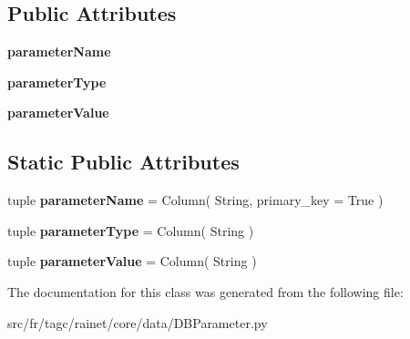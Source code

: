 \subsection*{Public Attributes}
\begin{DoxyCompactItemize}
\item 
\hypertarget{classsrc_1_1fr_1_1tagc_1_1rainet_1_1core_1_1data_1_1DBParameter_1_1DBParameter_ae61b54e9c86bb19e10582ed189111596}{{\bfseries parameter\-Name}}\label{classsrc_1_1fr_1_1tagc_1_1rainet_1_1core_1_1data_1_1DBParameter_1_1DBParameter_ae61b54e9c86bb19e10582ed189111596}

\item 
\hypertarget{classsrc_1_1fr_1_1tagc_1_1rainet_1_1core_1_1data_1_1DBParameter_1_1DBParameter_a329f4dcded2890e7bab8ddb09e4fcec8}{{\bfseries parameter\-Type}}\label{classsrc_1_1fr_1_1tagc_1_1rainet_1_1core_1_1data_1_1DBParameter_1_1DBParameter_a329f4dcded2890e7bab8ddb09e4fcec8}

\item 
\hypertarget{classsrc_1_1fr_1_1tagc_1_1rainet_1_1core_1_1data_1_1DBParameter_1_1DBParameter_a7fcbbd77050aedcabcc665855c477015}{{\bfseries parameter\-Value}}\label{classsrc_1_1fr_1_1tagc_1_1rainet_1_1core_1_1data_1_1DBParameter_1_1DBParameter_a7fcbbd77050aedcabcc665855c477015}

\end{DoxyCompactItemize}
\subsection*{Static Public Attributes}
\begin{DoxyCompactItemize}
\item 
\hypertarget{classsrc_1_1fr_1_1tagc_1_1rainet_1_1core_1_1data_1_1DBParameter_1_1DBParameter_a86bcecbfa4d17d8ea0e7813d37099bfb}{tuple {\bfseries parameter\-Name} = Column( String, primary\-\_\-key = True )}\label{classsrc_1_1fr_1_1tagc_1_1rainet_1_1core_1_1data_1_1DBParameter_1_1DBParameter_a86bcecbfa4d17d8ea0e7813d37099bfb}

\item 
\hypertarget{classsrc_1_1fr_1_1tagc_1_1rainet_1_1core_1_1data_1_1DBParameter_1_1DBParameter_a11ca0d30425ea6e54214a55a7858306a}{tuple {\bfseries parameter\-Type} = Column( String )}\label{classsrc_1_1fr_1_1tagc_1_1rainet_1_1core_1_1data_1_1DBParameter_1_1DBParameter_a11ca0d30425ea6e54214a55a7858306a}

\item 
\hypertarget{classsrc_1_1fr_1_1tagc_1_1rainet_1_1core_1_1data_1_1DBParameter_1_1DBParameter_a9aa1907729ed16909500d246909e0649}{tuple {\bfseries parameter\-Value} = Column( String )}\label{classsrc_1_1fr_1_1tagc_1_1rainet_1_1core_1_1data_1_1DBParameter_1_1DBParameter_a9aa1907729ed16909500d246909e0649}

\end{DoxyCompactItemize}


The documentation for this class was generated from the following file\-:\begin{DoxyCompactItemize}
\item 
src/fr/tagc/rainet/core/data/D\-B\-Parameter.\-py\end{DoxyCompactItemize}
